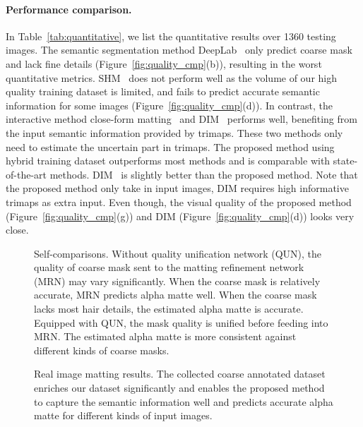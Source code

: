 \documentclass[10pt,twocolumn,letterpaper]{article}
\begin{document}
\paragraph{Performance comparison.}
In Table~\ref{tab:quantitative}, we list the quantitative results over 1360 testing images. The semantic segmentation method DeepLab~\cite{chen2017rethinking} only predict coarse mask and lack fine details (Figure~\ref{fig:quality_cmp}(b)), resulting in the worst quantitative metrics. SHM~\cite{chen2018semantic} does not perform well as the volume of our high quality training dataset is limited, and fails to predict accurate semantic information for some images (Figure~\ref{fig:quality_cmp}(d)). In contrast, the interactive method close-form matting~\cite{levin2007closed} and DIM~\cite{xu2017deep} performs well, benefiting from the input semantic information provided by trimaps. These two methods only need to estimate the uncertain part in trimaps. The proposed method using hybrid training dataset outperforms most methods and is comparable with state-of-the-art methods. DIM~\cite{xu2017deep} is slightly better than the proposed method. Note that the proposed method only take in input images, DIM requires high informative trimaps as extra input. Even though, the visual quality of the proposed method (Figure~\ref{fig:quality_cmp}(g)) and DIM (Figure~\ref{fig:quality_cmp}(d)) looks very close.





\begin{figure}[ht]
  \centering
  \caption{Self-comparisons. Without quality unification network (QUN), the quality of coarse mask sent to the matting refinement network (MRN) may vary significantly. When the coarse mask is relatively accurate, MRN predicts alpha matte well. When the coarse mask lacks most hair details, the estimated alpha matte is accurate. Equipped with QUN, the mask quality is unified before feeding into MRN. The estimated alpha matte is more consistent against different kinds of coarse masks.}
  \label{fig:mid_figure}
\end{figure}

\begin{figure}
  \centering
  \caption{Real image matting results. The collected coarse annotated dataset enriches our dataset significantly and enables the proposed method to capture the semantic information well and predicts accurate alpha matte for different kinds of input images.}
  \label{fig:real_image}
\end{figure}
\end{document}
